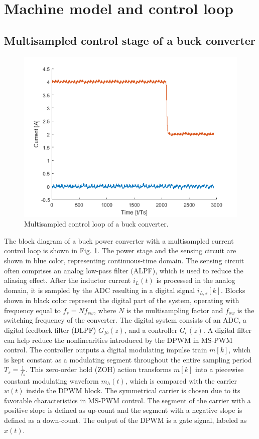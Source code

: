 \documentclass[journal]{IEEEtran}
\begin{document}
\section{Machine model and control loop}

\subsection{Multisampled control stage of a buck converter}

\begin{figure}[t!]
    \centerline{\includegraphics[width=0.95\linewidth]{figures/nas_step.png}}
    \caption{Multisampled control loop of a buck converter.}
    \label{fig:MSControl}
\end{figure}

The block diagram of a buck power converter with a multisampled current control loop is shown in Fig. \ref{fig:MSControl}. The power stage and the sensing circuit are shown in blue color, representing continuous-time domain. The sensing circuit often comprises an analog low-pass filter (ALPF), which is used to reduce the aliasing effect. After the inductor current $i_L(t)$ is processed in the analog domain, it is sampled by the ADC resulting in a digital signal $i_{L,s}[k]$. Blocks shown in black color represent the digital part of the system, operating with frequency equal to $f_s = N f_{sw}$, where $N$ is the multisampling factor and $f_{sw}$ is the switching frequency of the converter. The digital system consists of an ADC, a digital feedback filter (DLPF) $G_{fb}(z)$, and a controller $G_c(z)$. A digital filter can help reduce the nonlinearities introduced by the DPWM in MS-PWM control. The controller outputs a digital modulating impulse train $m[k]$, which is kept constant as a modulating segment throughout the entire sampling period $T_s = \frac{1}{f_s}$. This zero-order hold (ZOH) action transforms $m[k]$ into a piecewise constant modulating waveform $m_h (t)$, which is compared with the carrier $w(t)$ inside the DPWM block. The symmetrical carrier is chosen due to its favorable characteristics in MS-PWM control. The segment of the carrier with a positive slope is defined as up-count and the segment with a negative slope is defined as a down-count. The output of the DPWM is a gate signal, labeled as $x(t)$.
\end{document}
